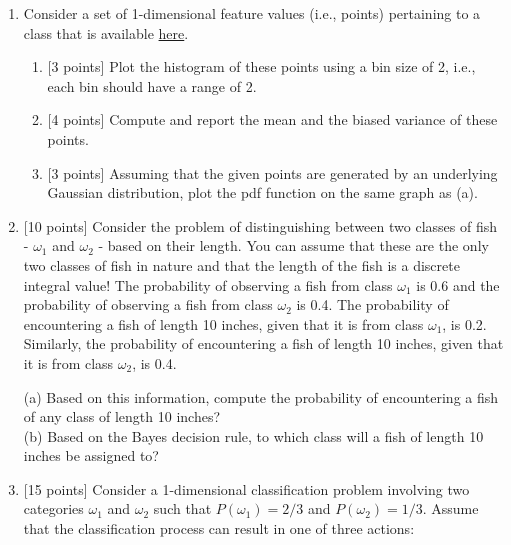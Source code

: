 \documentclass[11pt]{article}
\begin{document}
\begin{enumerate}


\item Consider a set of 1-dimensional feature values (i.e., points)  pertaining to a class that is available \href{http://www.cse.msu.edu/~rossarun/courses/sp21/cse802/data/hw02_data01.txt}{here}. 
\begin{enumerate}
\item{[3 points]} Plot the histogram of these points using a bin size of 2, i.e., each bin should have a range of 2. 
\item{[4 points]} Compute and report the mean and the biased variance of these points.
\item{[3 points]} Assuming that the given points are generated by an underlying Gaussian distribution, plot the pdf function on the same graph as (a).  
\end{enumerate}


\item{[10 points]} Consider the problem of distinguishing between two classes of fish - $\omega_1$ and $\omega_2$ - based on their length. You can assume that these are the only two classes of fish in nature and that the length of the fish is a discrete integral value! The probability of observing a fish from class $\omega_1$ is 0.6 and the probability of observing a fish from class $\omega_2$ is 0.4. The probability of encountering a fish of length 10 inches, given that it is from class $\omega_1$, is 0.2. Similarly, the probability of encountering a fish of length 10 inches, given that it is from class $\omega_2$, is 0.4. 

(a) Based on this information, compute the probability of encountering a fish of any class of length 10 inches?\\
(b) Based on the Bayes decision rule, to which class will a fish of length 10 inches be assigned to?\\


\item{[15 points]} Consider a 1-dimensional classification problem involving two categories
$\omega_1$ and $\omega_2$ such that $P(\omega_1) = 2/3$ and $P(\omega_2)
= 1/3$. Assume that the classification process can result in one of three 
actions:


\end{enumerate}
\end{document}
